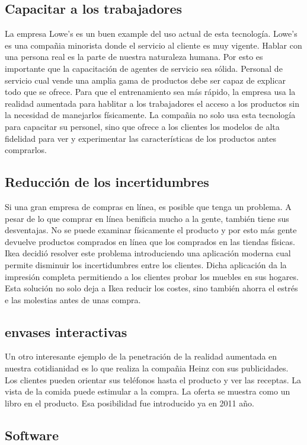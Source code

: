 \documentclass[a4paper,11pt]{scrartcl}
\begin{document}
\subsection{Capacitar a los trabajadores}
La empresa Lowe's es un buen example del uso actual de esta tecnología. Lowe's es una compañia minorista donde el servicio al cliente es muy vigente. Hablar con una persona real es la parte de nuestra naturaleza humana. Por esto es importante que la capacitación de agentes de servicio sea sólida. Personal de servicio cual vende una amplia gama de productos debe ser capaz de explicar todo que se ofrece. Para que el entrenamiento sea más rápido, la empresa usa la realidad aumentada para hablitar a los trabajadores el acceso a los productos sin la necesidad de manejarlos físicamente. La compañia no solo usa esta tecnología para capacitar su personel, sino que ofrece a los clientes los modelos de alta fidelidad para ver y experimentar las características de los productos antes comprarlos.
\subsection{Reducción de los incertidumbres}
Si  una gran empresa de compras en línea, es posible que tenga un problema. A pesar de lo que comprar en línea benificia mucho a la gente, también tiene sus desventajas. No se puede examinar físicamente el producto y por esto más gente devuelve productos comprados en línea que los comprados en las tiendas físicas. Ikea decidió resolver este problema introduciendo una aplicación moderna cual permite disminuir los incertidumbres entre los clientes. Dicha aplicación da la impresión completa permitiendo a los clientes probar los muebles en sus hogares. Esta solución no solo deja a Ikea reducir los costes, sino también ahorra el estrés e las molestias antes de unas compra.

\subsection{envases interactivas}
Un otro interesante ejemplo de la penetración de la realidad aumentada en nuestra cotidianidad es lo que realiza la compañia Heinz con sus publicidades. Los clientes pueden orientar sus teléfonos hasta el producto y ver las receptas. La vista de la comida puede estimular a la compra. La oferta se muestra como un libro en el producto. Esa posibilidad fue introducido ya en 2011 año.

\subsection{Software}
\end{document}
